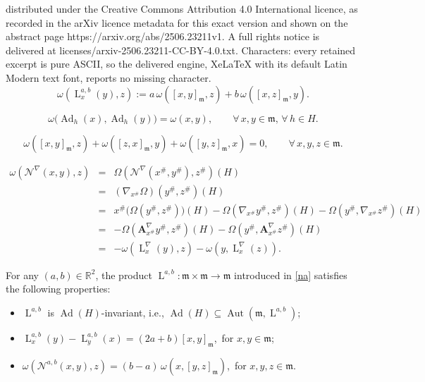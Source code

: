 \documentclass[10pt,a4paper]{amsart}
\newcommand{\Ad}{\operatorname{Ad}}
\newcommand{\Aut}{\operatorname{Aut}}
\newcommand{\A}{\mathbf{A}}
\newcommand{\ab}{(a,b)}
\newcommand{\lN}{\operatorname{L}^\n}
\newcommand{\lab}{\operatorname{L}^{a,b}}
\newcommand{\m}{\mathfrak{m}}
\newcommand{\n}{\nabla}
\newcommand{\rel}{\mathbb{R}}
\newcommand{\w}{\omega}
\begin{document}
distributed under the Creative Commons Attribution 4.0 International licence, as recorded in the arXiv licence metadata for this exact version and shown on the abstract page https://arxiv.org/abs/2506.23211v1. A full rights notice is delivered at licenses/arxiv-2506.23211-CC-BY-4.0.txt. Characters: every retained excerpt is pure ASCII, so the delivered engine, XeLaTeX with its default Latin Modern text font, reports no missing character.
\begin{equation}\label{na}
\omega\left(\lab_x(y),z\right):=a\,\omega\left([x,y]_\mathfrak{m},z\right)+b\,\omega\left([x,z]_\mathfrak{m},y\right).
\end{equation}

\begin{equation}\label{OmgSmlInv}
\omega\big(\Ad_h(x),\Ad_h(y)\big)=\omega(x,y),\qquad\forall\,x,y\in\mathfrak{m},\,\forall\,h\in H.
\end{equation}

\begin{equation}\label{Cocy}
\omega\left([x,y]_\mathfrak{m},z\right)+\omega\left([z,x]_\mathfrak{m},y\right)+\omega\left([y,z]_\mathfrak{m},x\right)=0,\qquad\forall\,x,y,z\in\m.
\end{equation}

\begin{eqnarray}\label{NGinv}
\omega\left(\mathcal{N}^\n(x,y),z\right)&=&\Omega\left(\mathcal{N}^\n(x^\#,y^\#),z^\#\right)(H)\nonumber\\
&=&\left(\n_{x^\#}\Omega\right)(y^\#,z^\#)(H)\nonumber\\
&=&x^\#\Big(\Omega(y^\#,z^\#)\Big)(H)-\Omega\left(\n_{x^\#}y^\#,z^\#\right)(H)-\Omega\left(y^\#,\n_{x^\#}z^\#\right)(H)\nonumber\\
&=&-\Omega\left(\A^\n_{x^\#}y^\#,z^\#\right)(H)-\Omega\left(y^\#,\A^\n_{x^\#}z^\#\right)(H)\nonumber\\
&=&-\omega\left(\lN_x(y),z\right)-\omega\left(y,\lN_x(z)\right).
\end{eqnarray}

\begin{proposition}\label{PrpPrda}
For any $\ab\in\rel^2$, the product $\lab:\mathfrak{m}\times\mathfrak{m}\to\mathfrak{m}$ introduced in \eqref{na} satisfies the following properties:
\begin{itemize}
\item[$1.$] $\lab$ is $\Ad(H)$-invariant, i.e., $\Ad(H)\subseteq\Aut\left(\mathfrak{m},\lab\right)$;
\item[$2.$] $\lab_x(y)-\lab_y(x)=(2a+b)[x,y]_\mathfrak{m}$,\,  for $x,y\in\mathfrak{m}$;
\item[$3.$] $\omega\left(\mathcal{N}^{a,b}(x,y),z\right)=(b-a)\,\w(x,[y,z]_\m)$,\, for $x,y,z\in\m$.
\end{itemize}
\end{proposition}
\end{document}
